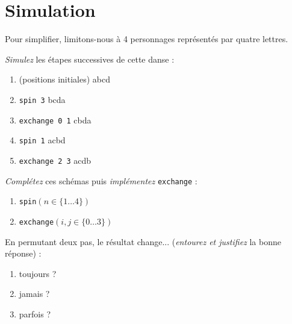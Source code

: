 \section{Simulation}
Pour simplifier, limitons-nous à 4 personnages
représentés par quatre lettres.

\begin{exo}\label{ex:sim}
\emph{Simulez} les étapes successives de cette danse :
	\begin{enumerate}%
	\item (positions initiales) \hfill \boxes abcd
	\item \texttt{spin 3} \hfill \boxes bcda
	\item \texttt{exchange 0 1} \hfill \boxes cbda
	\item \texttt{spin 1} \hfill \boxes acbd
	\item \texttt{exchange 2 3} \hfill \boxes acdb
	\end{enumerate}
\end{exo}

\begin{exo}
\emph{Complétez} ces schémas puis \emph{implémentez} \texttt{exchange} :
\begin{multicols}{2}
	\begin{enumerate}[label=]
	\item \emptyboxes \texttt{spin$(n\in\{1\dots4\})$}
	\item \emptyboxes \texttt{exchange$(i, j\in\{0\dots3\})$}
	\end{enumerate}
\end{multicols}
\end{exo}

\begin{exo}
En permutant deux pas, le résultat change...
	(\emph{entourez et justifiez} la bonne réponse) :
	\begin{enumerate}
		\item toujours ?
			\dotfill
		\item jamais ?
			\dotfill
		\item parfois ? 
			\dotfill
	\end{enumerate}
\end{exo}

